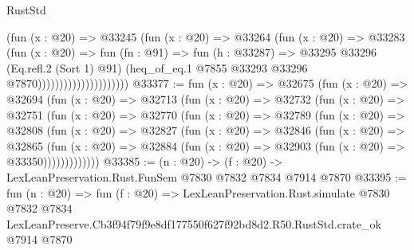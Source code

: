 \begin{lexlean}{RustStd}
\begin{coremodule}
                                    (fun (x : @20) =>
                                    @33245
                                      (fun (x : @20) =>
                                      @33264
                                        (fun (x : @20) =>
                                        @33283
                                          (fun (x : @20) =>
                                          fun (fn : @91) =>
                                          fun (h : @33287) =>
                                          @33295
                                            @33296
                                            (Eq.refl.{2} (Sort 1) @91)
                                            (heq_of_eq.{1}
                                              @7855
                                              @33293
                                              @33296
                                              @7870)))))))))))))))))))))
@33377 := fun (x : @20) =>
  @32675
    (fun (x : @20) =>
    @32694
      (fun (x : @20) =>
      @32713
        (fun (x : @20) =>
        @32732
          (fun (x : @20) =>
          @32751
            (fun (x : @20) =>
            @32770
              (fun (x : @20) =>
              @32789
                (fun (x : @20) =>
                @32808
                  (fun (x : @20) =>
                  @32827
                    (fun (x : @20) =>
                    @32846
                      (fun (x : @20) =>
                      @32865
                        (fun (x : @20) =>
                        @32884 (fun (x : @20) => @32903 (fun (x : @20) => @33350)))))))))))))
@33385 := (n : @20) -> (f : @20) -> LexLeanPreservation.Rust.FunSem @7830 @7832 @7834 @7914 @7870
@33395 := fun (n : @20) =>
  fun (f : @20) =>
  LexLeanPreservation.Rust.simulate
    @7830
    @7832
    @7834
    LexLeanPreserve.Cb3f94f79f9e8df177550f627f92bd8d2.R50.RustStd.crate_ok
    @7914
    @7870
\end{coremodule}
\end{lexlean}
